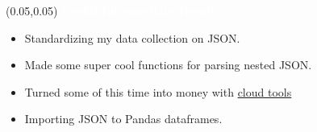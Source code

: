 \documentclass[aspectratio=169]{beamer} %
\begin{document}
\begin{frame}{}
    \setlength{\TPHorizModule}{\textwidth}
    \setlength{\TPVertModule}{\textwidth}
    \begin{textblock}{0.74}(0.05,0.05)
        \bfseries\large\textcolor{white}{Useful Intermediate Results}
    \end{textblock}
    \begin{itemize}
        \item Standardizing my data collection on JSON.
        \item Made some super cool functions for parsing nested JSON.
        \item Turned some of this time into money with \href{https://youtu.be/U62scNwsvc0}{cloud tools}
        \item Importing JSON to Pandas dataframes.
    \end{itemize}
\end{frame}
\end{document}
